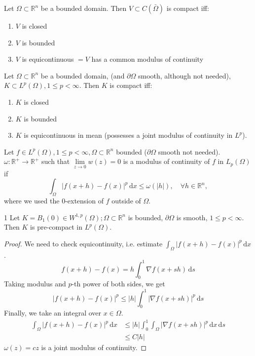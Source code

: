 \documentclass{report}
\begin{document}
{
    Let \(\Omega \subset \mathbb{R}^{n}\) be a bounded domain. Then \(V \subset C(\bar{\Omega})\) is compact iff:
    \begin{enumerate}
        \item \(V\)  is closed
        \item \(V\) is bounded
        \item \(V\) is equicontinuous \(= V\) has a common modulus of continuity
    \end{enumerate} 
}

{
    Let \(\Omega \subset \mathbb{R}^{n}\) be a bounded domain, (and \(\partial \Omega\) smooth, although not needed), \(K \subset L^{p}(\Omega), 1 \leq p < \infty\). Then \(K\) is compact iff:
    \begin{enumerate}
        \item \(K\) is closed
        \item \(K\) is bounded
        \item \(K\) is equicontinuous in mean (possesses a joint modulus of continuity in \(L^p\)).
    \end{enumerate} 
}

\dfn{}
{
    Let \(f \in L^p(\Omega), 1 \leq p < \infty, \Omega \subset \mathbb{R}^{n}\) bounded (\(\partial \Omega\) smooth not needed). \(\omega \colon \mathbb{R}^{+} \to \mathbb{R}^{+}\) such that \(\lim\limits_{z \to 0} w(z) = 0\) is a modulus of continuity of \(f\) in \(L_{p}(\Omega)\) if 
    \[
        \int_{\Omega} \vert f(x+h) - f(x) \vert ^p \,\mathrm{d}x \leq \omega(\vert h \vert ), \quad \forall h \in \mathbb{R}^n,
    \]
    where we used the \(0\)-extension of \(f\) outside of \(\Omega\). 
}

\begin{corollary}{}{1}
    Let \(K = B_{1}(0) \in W^{1, p}(\Omega); \Omega \subset \mathbb{R}^{n}\) is bounded, \(\partial \Omega\) is smooth, \(1 \leq p < \infty\). Then \(K\) is pre-compact in \(L^{p}(\Omega)\).
\end{corollary}

\begin{proof}
    We need to check equicontinuity, i.e. estimate \(\int_{\Omega} \vert f(x+h) - f(x) \vert ^p \,\mathrm{d}x \).
    \[
        f(x+h) - f(x) = h \int_{0}^{1} \nabla f(x + sh) \,\mathrm{d}s
    \]
    Taking modulus and \(p\)-th power of both sides, we get
    \[
        \vert f(x+h) - f(x) \vert ^p \leq \vert h \vert \int_{0}^{1} \vert \nabla f(x + sh) \vert ^p \,\mathrm{d}s 
    \]
    Finally, we take an integral over \(x \in \Omega\).
    \begin{align*}
        \int_{\Omega} \vert f(x+h) - f(x) \vert ^p \,\mathrm{d}x &\leq \vert h \vert \int_{0}^{1} \int_{\Omega} \vert \nabla f(x + sh) \vert ^p \,\mathrm{d}x \,\mathrm{d}s \\
        &\leq C \vert h \vert
    \end{align*}
    \(\omega(z) = cz\) is a joint modulus of continuity.
\end{proof}
\end{document}
